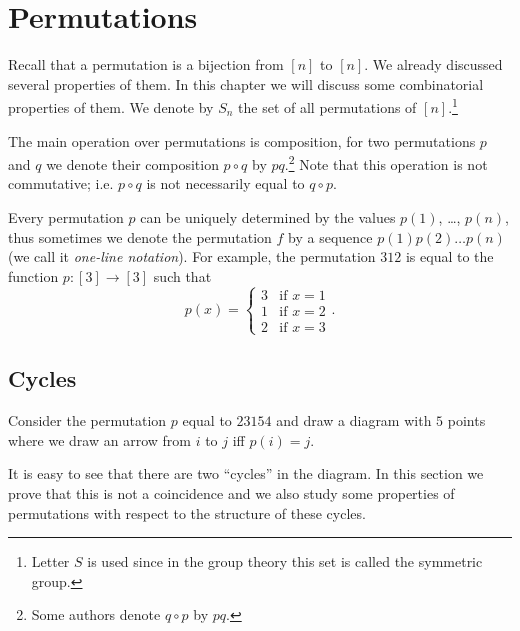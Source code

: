 \chapter{Permutations}
Recall that a permutation is a bijection from $[n]$ to $[n]$. We already
discussed several properties of them. In this chapter we will discuss some
combinatorial properties of them. We denote by $S_n$ the set of all
permutations of $[n]$.\footnote{%
  Letter $S$ is used since in the group theory this set is called
  the symmetric group.
}


The main operation over permutations is composition, for two permutations $p$
and $q$ we denote their composition $p \circ q$ by $pq$.\footnote{%
  Some authors denote $q \circ p$ by $pq$.
}
Note that this operation is not commutative; i.e. $p \circ q$ is not
necessarily equal to $q \circ p$.

Every permutation $p$ can be uniquely determined by the values $p(1)$, \dots,
$p(n)$, thus sometimes we denote the permutation $f$ by a sequence
$p(1) p(2) \dots p(n)$ (we call it \emph{one-line notation}).
For example, the permutation $3 1 2$ is equal to the function $p : [3] \to [3]$
such that
\[
  p(x) =
  \begin{cases}
    3 & \text{if } x = 1 \\
    1 & \text{if } x = 2 \\
    2 & \text{if } x = 3
  \end{cases}.
\]


\section{Cycles}
Consider the permutation $p$ equal to $2 3 1 5 4$ and draw a diagram with
$5$ points where we draw an arrow from $i$ to $j$ iff $p(i) = j$.
\begin{center}
\end{center}
It is easy to see that there are two ``cycles'' in the diagram. In this section
we prove that this is not a coincidence and we also study some properties of
permutations with respect to the structure of these cycles.

